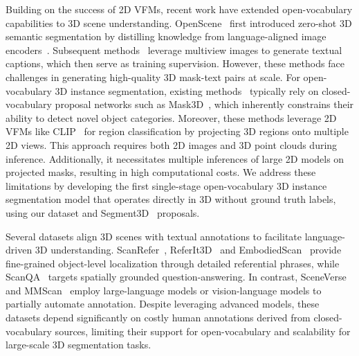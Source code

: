 Building on the success of 2D VFMs, recent work have extended open-vocabulary capabilities to 3D scene understanding.
OpenScene~\cite{Peng2023OpenScene} first introduced zero-shot 3D semantic segmentation by distilling knowledge from language-aligned image encoders~\cite{li2022language,ghiasi2022scaling}.
Subsequent methods~\cite{ding2022pla,yang2024regionplc,jiang2024open} leverage multiview images to generate textual captions, which then serve as training supervision.
However, these methods face challenges in generating high-quality 3D mask-text pairs at scale.
For open-vocabulary 3D instance segmentation, existing methods~\cite{takmaz2023openmask3d,nguyen2024open3dis,huang2024openins3d} typically rely on closed-vocabulary proposal networks such as Mask3D~\cite{schult2023mask3d}, which inherently constrains their ability to detect novel object categories. 
Moreover, these methods leverage 2D VFMs like CLIP~\cite{radfordLearningTransferableVisual2021} for region classification by projecting 3D regions onto multiple 2D views.
This approach requires both 2D images and 3D point clouds during inference. Additionally, it necessitates multiple inferences of large 2D models on projected masks, resulting in high computational costs. 
We address these limitations by developing the first single-stage open-vocabulary 3D instance segmentation model that operates directly in 3D without ground truth labels, using our \dataname dataset and Segment3D~\cite{huang2024segment3d} proposals.

Several datasets align 3D scenes with textual annotations to facilitate language-driven 3D understanding. 
ScanRefer~\cite{chen2020scanrefer}, ReferIt3D~\cite{achlioptas2020referit_3d} and EmbodiedScan~\cite{wangEmbodiedScanHolisticMultiModal2023} provide fine-grained object-level localization through detailed referential phrases, while ScanQA~\cite{azuma2022scanqa} targets spatially grounded question-answering. 
In contrast, SceneVerse~\cite{jiaSceneVerseScaling3D2024} and MMScan~\cite{lyu2024mmscan} employ large-language models or vision-language models to partially automate annotation.
Despite leveraging advanced models, these datasets depend significantly on costly human annotations derived from closed-vocabulary sources, limiting their support for open-vocabulary and scalability for large-scale 3D segmentation tasks.
